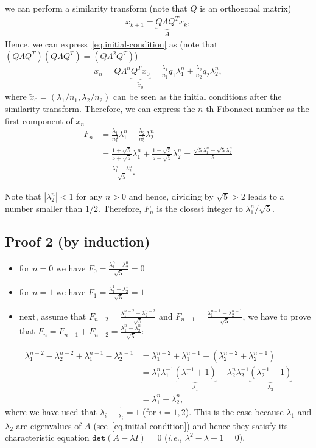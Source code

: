 \documentclass[12pt,a4paper]{article}
\newcommand\cc[1]{\texttt{#1}}
\begin{document}
we can perform a similarity transform (note that $Q$ is an orthogonal matrix)
\begin{align*}
  x_{k+1} = \underbrace{Q\Lambda Q^T}_{A} x_k,
\end{align*}
Hence, we can express~\eqref{eq.initial-condition} as (note that $(Q\Lambda Q^T)(Q\Lambda Q^T) = (Q\Lambda^2 Q^T)$)
\begin{align*}
  x_{n}
  = Q\Lambda^n \underbrace{Q^T x_0}_{\tilde{x}_0}
  = \frac{\lambda_1}{n_1}q_1\lambda_1^n + \frac{\lambda_2}{n_2}q_2\lambda_2^n,
\end{align*}
where $\tilde{x}_0 = (\lambda_1/n_1, \lambda_2/n_2)$ can be seen as the initial
conditions after the similarity transform. Therefore, we can express the $n$-th
Fibonacci number as the first component of $x_{n}$
\begin{align*}
  F_n
  &= \frac{\lambda_1}{n_1^2}\lambda_1^n + \frac{\lambda_2}{n_2^2}\lambda_2^n \\
  &= \frac{1 + \sqrt{5}}{5 + \sqrt{5}}\lambda_1^n + \frac{1 - \sqrt{5}}{5 - \sqrt{5}}\lambda_2^n
  = \frac{\sqrt{5}\lambda_1^n - \sqrt{5}\lambda_2^n}{5} \\
  &= \frac{\lambda_1^n - \lambda_2^n}{\sqrt{5}}.
\end{align*}

Note that $|\lambda_2^n| < 1$ for any $n > 0$ and hence, dividing by $\sqrt{5} > 2$
leads to a number smaller than $1/2$. Therefore, $F_n$ is the closest integer to
$\lambda_1^n / \sqrt{5}$.

\subsection{Proof 2 (by induction)}

\begin{itemize}
\item for $n = 0$ we have $F_0 = \frac{\lambda_1^{0} - \lambda_2^{0}}{\sqrt{5}} = 0$
\item for $n = 1$ we have $F_1 = \frac{\lambda_1^{1} - \lambda_2^{1}}{\sqrt{5}} = 1$
\item next, assume that $F_{n-2} = \frac{\lambda_1^{n-2} - \lambda_2^{n-2}}{\sqrt{5}}$
  and $F_{n-1} = \frac{\lambda_1^{n-1} - \lambda_2^{n-1}}{\sqrt{5}}$, we have to prove
  that $F_{n} = F_{n-1} + F_{n-2} = \frac{\lambda_1^{n} - \lambda_2^{n}}{\sqrt{5}}$:
\end{itemize}
\begin{align*}
  \lambda_1^{n-2} - \lambda_2^{n-2} + \lambda_1^{n-1} - \lambda_2^{n-1}
  &= \lambda_1^{n-2} + \lambda_1^{n-1} - (\lambda_2^{n-2} + \lambda_2^{n-1}) \\
  &= \lambda_1^n\lambda_1^{-1}\underbrace{(\lambda_1^{-1} + 1)}_{\lambda_1} - \lambda_2^n\lambda_2^{-1}\underbrace{(\lambda_2^{-1} + 1)}_{\lambda_2} \\
  &= \lambda_1^n - \lambda_2^n,
\end{align*}
where we have used that $\lambda_i - \frac{1}{\lambda_i} = 1$ (for $i=1,2$). This is the
case because $\lambda_1$ and $\lambda_2$ are eigenvalues of $A$
(see~\eqref{eq.initial-condition}) and hence they satisfy its characteristic equation
$\cc{det}(A - \lambda I) = 0$ (\emph{i.e.,} $\lambda^2 - \lambda -1 = 0$).
\end{document}
